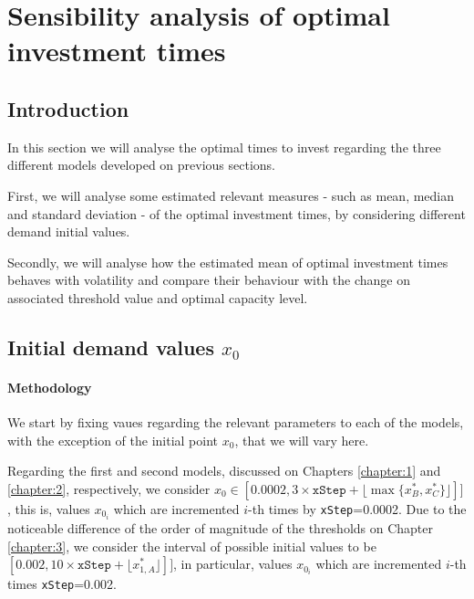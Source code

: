 \chapter{Sensibility analysis of optimal investment times}
\label{chapter:stoptime}



\section{Introduction}
\label{section:stoptime_intro}

In this section we will analyse the optimal times to invest regarding the three different models developed on previous sections.

First, we will analyse some estimated relevant measures - such as mean, median and standard deviation - of the optimal investment times, by considering different demand initial values.

Secondly, we will analyse how the estimated mean of optimal investment times behaves with volatility and compare their behaviour with the change on associated threshold value and optimal capacity level.

\section{Initial demand values $x_0$}

\subsubsection{Methodology}

We start by fixing vaues regarding the relevant parameters to each of the models, with the exception of the initial point $x_0$, that we will vary here.

Regarding the first and second models, discussed on Chapters \ref{chapter:1} and \ref{chapter:2}, respectively, we consider $x_0 \in [0.0002, 3 \times  \texttt{xStep} + \lfloor \max{ \{ x_B^*, x_C^* \} } \rfloor]  ]$, this is, values $x_{0_i}$ which are incremented $i$-th times by \texttt{xStep}=0.0002. Due to the noticeable difference of the order of magnitude of the thresholds on Chapter \ref{chapter:3}, we consider the interval of possible initial values to be $[0.002, 10 \times \texttt{xStep} +  \lfloor  x_{1,A}^* \rfloor] ]$, in particular, values $x_{0_i}$ which are incremented $i$-th times \texttt{xStep}=0.002.
		
